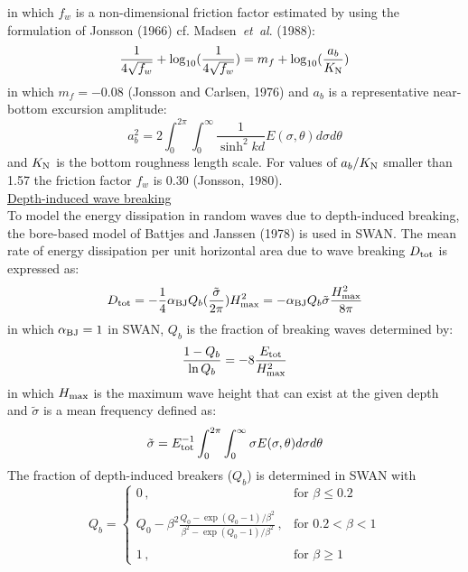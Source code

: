 \documentclass[12pt]{book}
\begin{document}
in which $f_w$ is a non-dimensional friction factor estimated by using the formulation of Jonsson (1966) cf.
Madsen~{\it et~al}. (1988):
\begin{equation}
  \frac{1}{4\sqrt{f_w}} + \log_{10} (\frac{1}{4\sqrt{f_w}}) = m_f + \log_{10} (\frac{a_b}{K_{\rm N}})
  \label{eq3-20}
\end{equation}
in which $m_f = -0.08$ (Jonsson and Carlsen, 1976) and $a_b$ is a representative near-bottom excursion
amplitude:
\begin{equation}
  a^2_{b} = 2\int_{0}^{2\pi} \int_{0}^{\infty} \frac{1}{\sinh^2 kd} E(\sigma,\theta) d\sigma d\theta
  \label{eq3-21}
\end{equation}
and $K_{\rm N}$ is the bottom roughness length scale. For values of $a_b/K_{\rm N}$ smaller than 1.57 the
friction factor $f_w$ is 0.30 (Jonsson, 1980).
\nocite{Jon76C,Jon80}
\\[2ex]
\noindent
\underline{Depth-induced wave breaking}\\[2ex]
To model the energy dissipation in random waves due to depth-induced breaking, the bore-based model
of Battjes and Janssen (1978) is used in SWAN. The mean rate of energy dissipation per unit horizontal
area due to wave breaking $D_{\rm tot}$ is expressed as:
\begin{equation}
  D_{\rm tot} = - \frac{1}{4} \alpha_{\rm BJ} Q_b (\frac{\tilde{\sigma}}{2\pi}) H^2_{\rm max}
              = - \alpha_{\rm BJ} Q_b \tilde{\sigma} \frac{H^2_{\rm max}}{8\pi}
  \label{eq3-22}
\end{equation}
in which $\alpha_{\rm BJ} = 1$ in SWAN, $Q_b$ is the fraction of breaking waves determined by:
\begin{equation}
  \frac{1 - Q_b}{\ln Q_b} = -8 \frac{E_{\rm tot}}{H_{\rm max}^2}
  \label{eq3-23}
\end{equation}
in which $H_{\rm max}$ is the maximum wave height that can exist at the given depth and ${\tilde{\sigma}}$
is a mean frequency defined as:
\begin{equation}
  \tilde{\sigma} = E^{-1}_{\rm tot} \int_{0}^{2\pi} \int_{0}^{\infty} \sigma E(\sigma,\theta) d\sigma d\theta
  \label{eq3-24}
\end{equation}
The fraction of depth-induced breakers ($Q_b$) is determined in SWAN with
\begin{equation}
   Q_b =
    \left\{
      \begin{array}{ll}
         0 \, , & \mbox{for } \beta \leq 0.2 \\
         \\
         Q_0 - \beta^2 \frac{Q_0 - \exp{(Q_0 - 1)/\beta^2}}{\beta^2 - \exp{(Q_0 - 1)/\beta^2}}
         \, , & \mbox{for }  0.2 < \beta < 1\\
         \\
         1 \, , & \mbox{for }  \beta \geq 1
      \end{array}
    \right.
  \label{eq3-25}
\end{equation}
\end{document}
